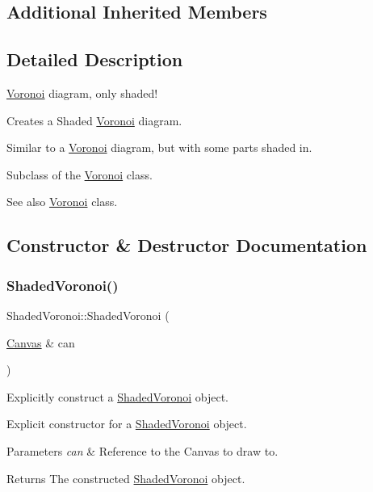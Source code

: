 \subsection*{Additional Inherited Members}


\subsection{Detailed Description}
\hyperlink{class_voronoi}{Voronoi} diagram, only shaded! 

Creates a Shaded \hyperlink{class_voronoi}{Voronoi} diagram.

Similar to a \hyperlink{class_voronoi}{Voronoi} diagram, but with some parts shaded in.

Subclass of the \hyperlink{class_voronoi}{Voronoi} class. \begin{DoxySeeAlso}{See also}
\hyperlink{class_voronoi}{Voronoi} class. 
\end{DoxySeeAlso}


\subsection{Constructor \& Destructor Documentation}
\mbox{\label{class_shaded_voronoi_a3005ac828c9b8cd099e369c89775c9c9}} 
\subsubsection{\texorpdfstring{Shaded\+Voronoi()}{ShadedVoronoi()}}
{\footnotesize\ttfamily Shaded\+Voronoi\+::\+Shaded\+Voronoi (\begin{DoxyParamCaption}\item[{\hyperlink{classtsgl_1_1_canvas}{Canvas} \&}]{can }\end{DoxyParamCaption})}



Explicitly construct a \hyperlink{class_shaded_voronoi}{Shaded\+Voronoi} object. 

Explicit constructor for a \hyperlink{class_shaded_voronoi}{Shaded\+Voronoi} object. 
\begin{DoxyParams}{Parameters}
{\em can} & Reference to the Canvas to draw to. \\
\hline
\end{DoxyParams}
\begin{DoxyReturn}{Returns}
The constructed \hyperlink{class_shaded_voronoi}{Shaded\+Voronoi} object. 
\end{DoxyReturn}
\mbox{\label{class_shaded_voronoi_a7f006a50875f62677e209763b6ae2709}} 
